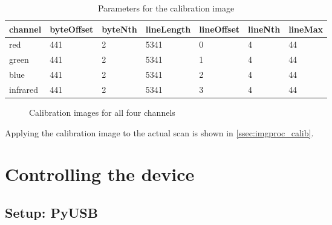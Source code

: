 \documentclass{article}
\begin{document}
\begin{table}[H]
  \caption{Parameters for the calibration image}
  \centering
  \begin{tabular}{l|l|l|l|l|l|l}
    channel & byteOffset & byteNth & lineLength & lineOffset & lineNth & lineMax \\ \hline
    red & 441 & 2 & 5341 & 0 & 4 & 44 \\
    green & 441 & 2 & 5341 & 1 & 4 & 44 \\
    blue & 441 & 2 & 5341 & 2 & 4 & 44 \\
    infrared & 441 & 2 & 5341 & 3 & 4 & 44 \\
  \end{tabular}
\end{table}


\begin{figure}[H]
  \caption{Calibration images for all four channels}
  \centering
  
\end{figure}

Applying the calibration image to the actual scan is shown in \autoref{ssec:imgproc_calib}.

\section{Controlling the device}

\subsection{Setup: PyUSB}
\end{document}
